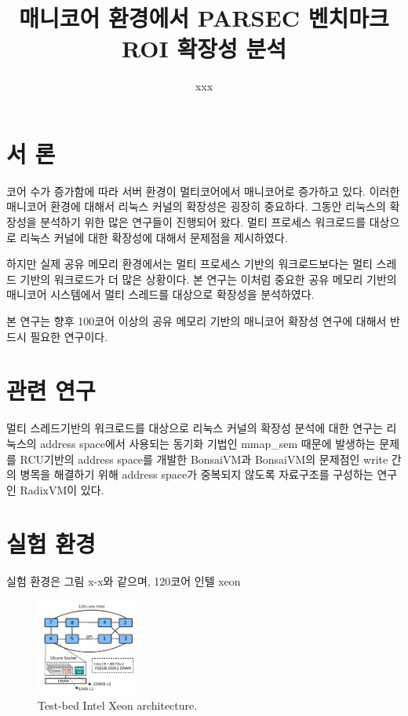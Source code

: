 \documentclass{kcc}
\title{매니코어 환경에서 PARSEC 벤치마크 \\ROI 확장성 분석}
\author{
xxx
}
\begin{document}
\maketitle


\section{서 론}
코어 수가 증가함에 따라 서버 환경이 멀티코어에서 매니코어로 증가하고 있다. 
이러한 매니코어 환경에 대해서 리눅스 커널의 확장성은 굉장히 중요하다. 
그동안 리눅스의 확장성을 분석하기 위한 많은 연구들이 진행되어 왔다. 
멀티 프로세스 워크로드를 대상으로 리눅스 커널에 대한 확장성에 대해서 문제점을 제시하였다.

하지만 실제 공유 메모리 환경에서는 멀티 프로세스 기반의 워크로드보다는 멀티 스레드 기반의 
워크로드가 더 많은 상황이다.
본 연구는 이처럼 중요한 공유 메모리 기반의 매니코어 시스템에서 멀티 스레드를 대상으로 확장성을 분석하였다.

본 연구는 향후 100코어 이상의 공유 메모리 기반의 매니코어 확장성 연구에 대해서 반드시 필요한 연구이다.



\section{관련 연구}

멀티 스레드기반의 워크로드를 대상으로 리눅스 커널의 확장성 분석에 대한 연구는 리눅스의 
address space에서 사용되는 동기화 기법인 mmap\_sem 때문에 발생하는 문제를 RCU기반의 address space를 
개발한 BonsaiVM과 BonsaiVM의 문제점인 write 간의 병목을 해결하기 위해 address space가 중복되지 않도록
자료구조를 구성하는 연구인 RadixVM이 있다.

\section{실험 환경}

실험 환경은 그림 x-x와 같으며, 120코어 인텔 xeon 
\begin{figure}[h]
  \begin{center}
     \includegraphics[width=0.3\textwidth]{fig/xeon}
  \end{center}
  \caption{Test-bed Intel Xeon architecture.}
  \label{fig:basic}
\end{figure}
\end{document}
